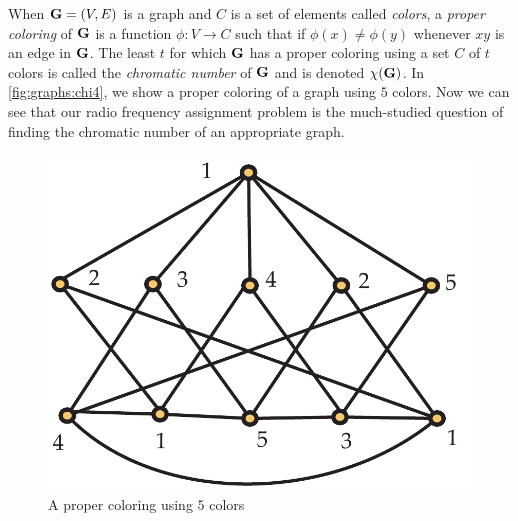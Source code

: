 When $\mathbf{G}=(V,E)$ is a graph and $C$ is a set of elements called
\textit{colors}, a \textit{proper coloring} of $\mathbf{G}$ is a function
$\phi:V\to C$ such that if $\phi(x)\neq \phi(y)$ whenever $xy$ is an
edge in $\mathbf{G}$.  The least $t$ for which $\mathbf{G}$ has a proper coloring
using a set $C$ of $t$ colors is called the \textit{chromatic number}
of $\mathbf{G}$ and is denoted $\chi(\mathbf{G})$.  In \autoref{fig:graphs:chi4},
we show a proper coloring of a graph using $5$ colors. Now we can see
that our radio frequency assignment problem is the much-studied
question of finding the chromatic number of an appropriate graph.
\begin{figure}[h]
\begin{center}
\includegraphics*[scale=0.63]{graphs-figs/chi4}
\caption{\label{fig:graphs:chi4}A proper coloring using $5$ colors}
\end{center}
\end{figure}

